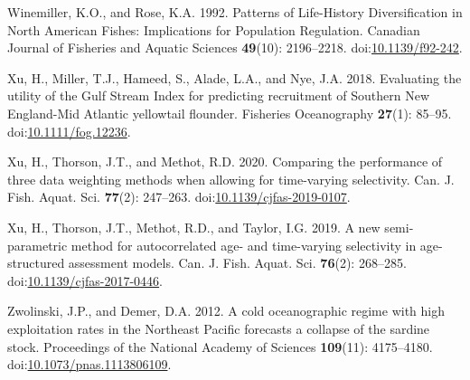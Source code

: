 \documentclass[]{article}
\begin{document}
\leavevmode\hypertarget{ref-winemiller1992Patterns}{}%
Winemiller, K.O., and Rose, K.A. 1992. Patterns of Life-History
Diversification in North American Fishes: Implications for Population
Regulation. Canadian Journal of Fisheries and Aquatic Sciences
\textbf{49}(10): 2196--2218.
doi:\href{https://doi.org/10.1139/f92-242}{10.1139/f92-242}.

\leavevmode\hypertarget{ref-xu2018Evaluating}{}%
Xu, H., Miller, T.J., Hameed, S., Alade, L.A., and Nye, J.A. 2018.
Evaluating the utility of the Gulf Stream Index for predicting
recruitment of Southern New England-Mid Atlantic yellowtail flounder.
Fisheries Oceanography \textbf{27}(1): 85--95.
doi:\href{https://doi.org/10.1111/fog.12236}{10.1111/fog.12236}.

\leavevmode\hypertarget{ref-xu2020Comparing}{}%
Xu, H., Thorson, J.T., and Methot, R.D. 2020. Comparing the performance
of three data weighting methods when allowing for time-varying
selectivity. Can. J. Fish. Aquat. Sci. \textbf{77}(2): 247--263.
doi:\href{https://doi.org/10.1139/cjfas-2019-0107}{10.1139/cjfas-2019-0107}.

\leavevmode\hypertarget{ref-xu2019New}{}%
Xu, H., Thorson, J.T., Methot, R.D., and Taylor, I.G. 2019. A new
semi-parametric method for autocorrelated age- and time-varying
selectivity in age-structured assessment models. Can. J. Fish. Aquat.
Sci. \textbf{76}(2): 268--285.
doi:\href{https://doi.org/10.1139/cjfas-2017-0446}{10.1139/cjfas-2017-0446}.

\leavevmode\hypertarget{ref-zwolinski2012Cold}{}%
Zwolinski, J.P., and Demer, D.A. 2012. A cold oceanographic regime with
high exploitation rates in the Northeast Pacific forecasts a collapse of
the sardine stock. Proceedings of the National Academy of Sciences
\textbf{109}(11): 4175--4180.
doi:\href{https://doi.org/10.1073/pnas.1113806109}{10.1073/pnas.1113806109}.

\pagebreak
\end{document}
